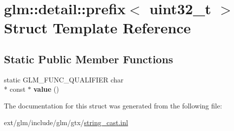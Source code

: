 \hypertarget{structglm_1_1detail_1_1prefix_3_01uint32__t_01_4}{\section{glm\-:\-:detail\-:\-:prefix$<$ uint32\-\_\-t $>$ Struct Template Reference}
\label{structglm_1_1detail_1_1prefix_3_01uint32__t_01_4}
}
\subsection*{Static Public Member Functions}
\begin{DoxyCompactItemize}
\item 
\hypertarget{structglm_1_1detail_1_1prefix_3_01uint32__t_01_4_a8a36d8e3a869d300408dde031429352e}{static G\-L\-M\-\_\-\-F\-U\-N\-C\-\_\-\-Q\-U\-A\-L\-I\-F\-I\-E\-R char \\*
const $\ast$ {\bfseries value} ()}\label{structglm_1_1detail_1_1prefix_3_01uint32__t_01_4_a8a36d8e3a869d300408dde031429352e}

\end{DoxyCompactItemize}


The documentation for this struct was generated from the following file\-:\begin{DoxyCompactItemize}
\item 
ext/glm/include/glm/gtx/\hyperlink{string__cast_8inl}{string\-\_\-cast.\-inl}\end{DoxyCompactItemize}
